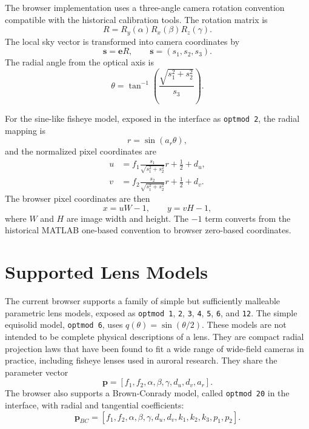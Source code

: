 \documentclass[11pt]{article}
\begin{document}
The browser implementation uses a three-angle camera rotation convention
compatible with the historical calibration tools. The rotation matrix is
\begin{equation}
  R = R_y(\alpha) R_x(\beta) R_z(\gamma).
\end{equation}
The local sky vector is transformed into camera coordinates by
\begin{equation}
  \mathbf{s} = \mathbf{e} R,
  \qquad
  \mathbf{s} = (s_1, s_2, s_3).
\end{equation}
The radial angle from the optical axis is
\begin{equation}
  \theta = \tan^{-1}\left(\frac{\sqrt{s_1^2+s_2^2}}{s_3}\right).
\end{equation}

For the sine-like fisheye model, exposed in the interface as
\texttt{optmod 2}, the radial mapping is
\begin{equation}
  r = \sin(a_r \theta),
\end{equation}
and the normalized pixel coordinates are
\begin{align}
  u &= f_1 \frac{s_1}{\sqrt{s_1^2+s_2^2}} r + \frac{1}{2} + d_u, \\
  v &= f_2 \frac{s_2}{\sqrt{s_1^2+s_2^2}} r + \frac{1}{2} + d_v.
\end{align}
The browser pixel coordinates are then
\begin{equation}
  x = u W - 1, \qquad y = v H - 1,
\end{equation}
where \(W\) and \(H\) are image width and height. The \(-1\) term converts from
the historical MATLAB one-based convention to browser zero-based coordinates.

\section{Supported Lens Models}

The current browser supports a family of simple but sufficiently malleable
parametric lens models, exposed as \texttt{optmod 1}, \texttt{2}, \texttt{3},
\texttt{4}, \texttt{5}, \texttt{6}, and \texttt{12}. The simple equisolid
model, \texttt{optmod 6}, uses $q(\theta)=\sin(\theta/2)$. These models are not intended to be
complete physical descriptions of a lens. They are compact radial projection
laws that have been found to fit a wide range of wide-field cameras in
practice, including fisheye lenses used in auroral research. They share the
parameter vector
\begin{equation}
  \mathbf{p} = [f_1, f_2, \alpha, \beta, \gamma, d_u, d_v, a_r].
\end{equation}
The browser also supports a Brown-Conrady model, called \texttt{optmod 20} in
the interface, with radial and tangential coefficients:
\begin{equation}
  \mathbf{p}_{BC} =
  [f_1, f_2, \alpha, \beta, \gamma, d_u, d_v,
   k_1, k_2, k_3, p_1, p_2].
\end{equation}
\end{document}
